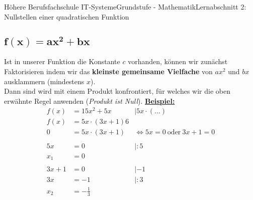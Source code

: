 \documentclass[11pt,twocolumn,oneside,openany,headings=optiontotoc,11pt,numbers=noenddot]{article}
\begin{document}
\begin{worksheet}{Höhere Berufsfachschule IT-Systeme}{Grundstufe - Mathematik}{Lernabschnitt 2: Nullstellen einer quadratischen Funktion}
		\subsection{\(\mathbf{f(x) = ax^2 + bx}\)}
		Ist in unserer Funktion die Konstante \(c\) vorhanden, können wir zunächst Faktorisieren indem wir das \textbf{kleinste gemeinsame Vielfache} von \(ax^2\) und \(bx\) ausklammern (mindestens \(x\)).\\
		Dann sind wird mit einem Produkt konfrontiert, für welches wir die oben erwähnte Regel anwenden (\textit{Produkt ist Null}).
		\underline{\textbf{Beispiel:}}
		\begin{align*}
			f(x) & = 15x^2 + 5x & |5x\cdot(\ldots)\\
			f(x) & = 5x\cdot(3x + 1) 6\\
			0 & = 5x\cdot(3x+1) & \Leftrightarrow 5x = 0\ \text{oder}\ 3x+1 = 0\\
			\\
			5x & = 0  & |:5\\
			x_1 & = 0\\
			\\
			3x + 1 & = 0 & | -1\\
			3x & = -1 & |:3\\
			x_2 & = -\frac{1}{3}
		\end{align*}
	\end{worksheet}
\end{document}
